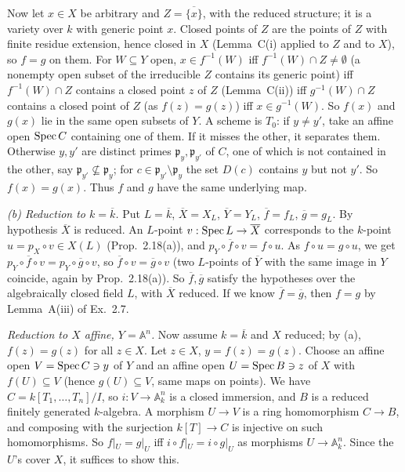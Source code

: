 \documentclass[11pt]{article}
\begin{document}
Now let $x\in X$ be arbitrary and $Z=\overline{\{x\}}$, with the reduced structure; it is a variety over $k$ with generic point $x$. Closed points of $Z$ are the points of $Z$ with finite residue extension, hence closed in $X$ (Lemma~C(i) applied to $Z$ and to $X$), so $f=g$ on them. For $W\subseteq Y$ open, $x\in f^{-1}(W)$ iff $f^{-1}(W)\cap Z\neq\emptyset$ (a nonempty open subset of the irreducible $Z$ contains its generic point) iff $f^{-1}(W)\cap Z$ contains a closed point $z$ of $Z$ (Lemma~C(ii)) iff $g^{-1}(W)\cap Z$ contains a closed point of $Z$ (as $f(z)=g(z)$) iff $x\in g^{-1}(W)$. So $f(x)$ and $g(x)$ lie in the same open subsets of $Y$. A scheme is $T_0$: if $y\ne y'$, take an affine open $\operatorname{Spec} C$ containing one of them. If it misses the other, it separates them. Otherwise $y,y'$ are distinct primes $\mathfrak p_y,\mathfrak p_{y'}$ of $C$, one of which is not contained in the other, say $\mathfrak p_{y'}\not\subseteq\mathfrak p_y$; for $c\in\mathfrak p_{y'}\setminus\mathfrak p_y$ the set $D(c)$ contains $y$ but not $y'$. So $f(x)=g(x)$. Thus $f$ and $g$ have the same underlying map.

\emph{(b) Reduction to $k=\overline k$.} Put $L=\overline k$, $\overline X=X_L$, $\overline Y=Y_L$, $\overline f=f_L$, $\overline g=g_L$. By hypothesis $\overline X$ is reduced. An $L$-point $v:\operatorname{Spec} L\to\overline X$ corresponds to the $k$-point $u=p_X\circ v\in X(L)$ (Prop.~2.18(a)), and $p_Y\circ\overline f\circ v=f\circ u$. As $f\circ u=g\circ u$, we get $p_Y\circ\overline f\circ v=p_Y\circ\overline g\circ v$, so $\overline f\circ v=\overline g\circ v$ (two $L$-points of $\overline Y$ with the same image in $Y$ coincide, again by Prop.~2.18(a)). So $\overline f,\overline g$ satisfy the hypotheses over the algebraically closed field $L$, with $\overline X$ reduced. If we know $\overline f=\overline g$, then $f=g$ by Lemma~A(iii) of Ex.~2.7.

\emph{Reduction to $X$ affine, $Y=\mathbb A^n$.} Now assume $k=\overline k$ and $X$ reduced; by (a), $f(z)=g(z)$ for all $z\in X$. Let $z\in X$, $y=f(z)=g(z)$. Choose an affine open $V=\operatorname{Spec} C\ni y$ of $Y$ and an affine open $U=\operatorname{Spec} B\ni z$ of $X$ with $f(U)\subseteq V$ (hence $g(U)\subseteq V$, same maps on points). We have $C=k[T_1,\dots,T_n]/I$, so $i:V\to\mathbb A^n_k$ is a closed immersion, and $B$ is a reduced finitely generated $k$-algebra. A morphism $U\to V$ is a ring homomorphism $C\to B$, and composing with the surjection $k[T]\to C$ is injective on such homomorphisms. So $f|_U=g|_U$ iff $i\circ f|_U=i\circ g|_U$ as morphisms $U\to\mathbb A^n_k$. Since the $U$'s cover $X$, it suffices to show this.
\end{document}
